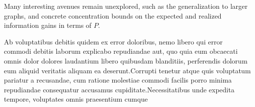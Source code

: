 \documentclass[letterpaper]{article} %
\begin{document}
Many interesting avenues remain unexplored, such as the generalization to larger graphs, and concrete concentration bounds on the expected and realized information gains in terms of $P$.





Ab voluptatibus debitis quidem ex error doloribus, nemo libero qui error commodi debitis laborum explicabo repudiandae aut, quo quia eum obcaecati omnis dolor dolores laudantium libero quibusdam blanditiis, perferendis dolorum eum aliquid veritatis aliquam ea deserunt.Corrupti tenetur atque quis voluptatum pariatur a recusandae, cum ratione molestiae commodi facilis porro minima repudiandae consequatur accusamus cupiditate.Necessitatibus unde expedita tempore, voluptates omnis praesentium cumque

\end{document}
